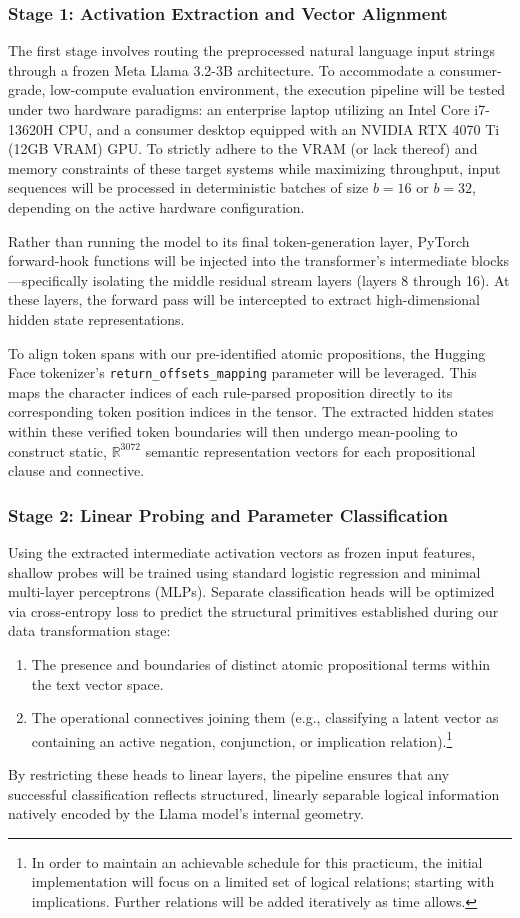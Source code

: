\documentclass[12 pt]{article}  %
\newcommand{\Reals}[0]{\mathbb{R}}      %
\begin{document}
\subsubsection{Stage 1: Activation Extraction and Vector Alignment}
The first stage involves routing the preprocessed natural language input strings through a frozen Meta Llama 3.2-3B architecture. To accommodate a consumer-grade, low-compute evaluation environment, the execution pipeline will be tested under two hardware paradigms: an enterprise laptop utilizing an Intel Core i7-13620H CPU, and a consumer desktop equipped with an NVIDIA RTX 4070 Ti (12GB VRAM) GPU. To strictly adhere to the VRAM (or lack thereof) and memory constraints of these target systems while maximizing throughput, input sequences will be processed in deterministic batches of size $b=16$ or $b=32$, depending on the active hardware configuration.

Rather than running the model to its final token-generation layer, PyTorch forward-hook functions will be injected into the transformer's intermediate blocks—specifically isolating the middle residual stream layers (layers 8 through 16). At these layers, the forward pass will be intercepted to extract high-dimensional hidden state representations. 

To align token spans with our pre-identified atomic propositions, the Hugging Face tokenizer's \texttt{return\_offsets\_mapping} parameter will be leveraged. This maps the character indices of each rule-parsed proposition directly to its corresponding token position indices in the tensor. The extracted hidden states within these verified token boundaries will then undergo mean-pooling to construct static, $\Reals^{3072}$ semantic representation vectors for each propositional clause and connective.

\subsubsection{Stage 2: Linear Probing and Parameter Classification}
Using the extracted intermediate activation vectors as frozen input features, shallow probes will be trained using standard logistic regression and minimal multi-layer perceptrons (MLPs). Separate classification heads will be optimized via cross-entropy loss to predict the structural primitives established during our data transformation stage:
\begin{enumerate}
    \item The presence and boundaries of distinct atomic propositional terms within the text vector space.
    \item The operational connectives joining them (e.g., classifying a latent vector as containing an active negation, conjunction, or implication relation).\footnote{In order to maintain an achievable schedule for this practicum, the initial implementation will focus on a limited set of logical relations; starting with implications. Further relations will be added iteratively as time allows.}
\end{enumerate}
By restricting these heads to linear layers, the pipeline ensures that any successful classification reflects structured, linearly separable logical information natively encoded by the Llama model's internal geometry.
\end{document}
